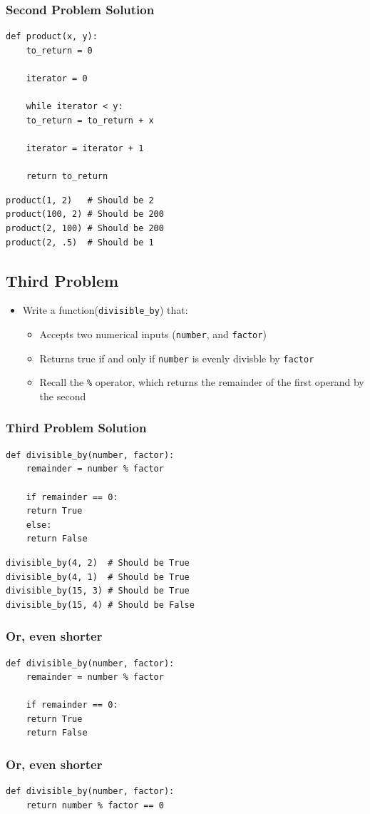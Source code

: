 \documentclass[11pt]{article}
\begin{document}
\subsubsection{Second Problem Solution}
\label{sec:orgaf62ca1}
\begin{verbatim}
def product(x, y):
    to_return = 0

    iterator = 0

    while iterator < y:
	to_return = to_return + x

	iterator = iterator + 1

    return to_return
\end{verbatim}
\begin{verbatim}
product(1, 2)   # Should be 2
product(100, 2) # Should be 200
product(2, 100) # Should be 200
product(2, .5)  # Should be 1
\end{verbatim}
\subsection{Third Problem}
\label{sec:org3fc4439}
\begin{itemize}
\item Write a function(\texttt{divisible\_by}) that:
\begin{itemize}
\item Accepts two numerical inputs (\texttt{number}, and \texttt{factor})
\item Returns true if and only if \texttt{number} is evenly divisble by \texttt{factor}
\item Recall the \texttt{\%} operator, which returns the remainder of the first operand by the second
\end{itemize}
\end{itemize}
\subsubsection{Third Problem Solution}
\label{sec:org47f906f}
\begin{verbatim}
def divisible_by(number, factor):
    remainder = number % factor

    if remainder == 0:
	return True
    else:
	return False
\end{verbatim}
\begin{verbatim}
divisible_by(4, 2)  # Should be True
divisible_by(4, 1)  # Should be True
divisible_by(15, 3) # Should be True
divisible_by(15, 4) # Should be False
\end{verbatim}

\subsubsection{Or, even shorter}
\label{sec:orge6c6e9d}
\begin{verbatim}
def divisible_by(number, factor):
    remainder = number % factor

    if remainder == 0:
	return True
    return False
\end{verbatim}
\subsubsection{Or, even shorter}
\label{sec:orgfdfa515}
\begin{verbatim}
def divisible_by(number, factor):
    return number % factor == 0
\end{verbatim}
\end{document}
